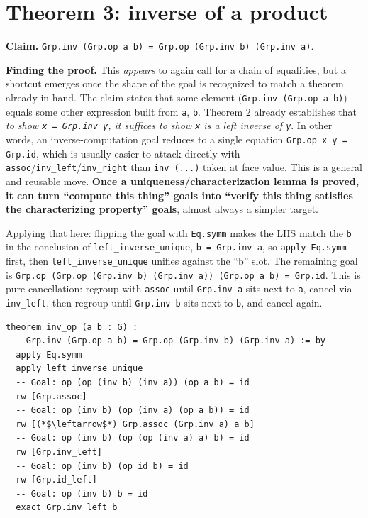 \section{Theorem 3: inverse of a product}\label{sec:07-group-theorems:04-theorem-3:1}

\textbf{Claim.} \texttt{Grp.inv (Grp.op a b) = Grp.op (Grp.inv b) (Grp.inv a)}.

\textbf{Finding the proof.} This \emph{appears} to again call for a chain of equalities, but a shortcut emerges once the shape of the goal is recognized to match a theorem already in hand. The claim states that some element (\texttt{Grp.inv (Grp.op a b)}) equals some other expression built from \texttt{a}, \texttt{b}. Theorem 2 already establishes that \emph{to show \texttt{x = Grp.inv y}, it suffices to show \texttt{x} is a left inverse of \texttt{y}}. In other words, an inverse-computation goal reduces to a single equation \texttt{Grp.op x y = Grp.id}, which is usually easier to attack directly with \texttt{assoc}/\texttt{inv\_\allowbreak{}left}/\texttt{inv\_\allowbreak{}right} than \texttt{inv (...)} taken at face value. This is a general and reusable move. \textbf{Once a uniqueness/characterization lemma is proved, it can turn ``compute this thing'' goals into ``verify this thing satisfies the characterizing property'' goals}, almost always a simpler target.

Applying that here: flipping the goal with \texttt{Eq.symm} makes the LHS match the \texttt{b} in the conclusion of \texttt{left\_\allowbreak{}inverse\_\allowbreak{}unique}, \texttt{b = Grp.inv a}, so \texttt{apply Eq.symm} first, then \texttt{left\_\allowbreak{}inverse\_\allowbreak{}unique} unifies against the ``b'' slot. The remaining goal is \texttt{Grp.op (Grp.op (Grp.inv b) (Grp.inv a)) (Grp.op a b) = Grp.id}. This is pure cancellation: regroup with \texttt{assoc} until \texttt{Grp.inv a} sits next to \texttt{a}, cancel via \texttt{inv\_\allowbreak{}left}, then regroup until \texttt{Grp.inv b} sits next to \texttt{b}, and cancel again.

\begin{lstlisting}
theorem inv_op (a b : G) :
    Grp.inv (Grp.op a b) = Grp.op (Grp.inv b) (Grp.inv a) := by
  apply Eq.symm
  apply left_inverse_unique
  -- Goal: op (op (inv b) (inv a)) (op a b) = id
  rw [Grp.assoc]
  -- Goal: op (inv b) (op (inv a) (op a b)) = id
  rw [(*$\leftarrow$*) Grp.assoc (Grp.inv a) a b]
  -- Goal: op (inv b) (op (op (inv a) a) b) = id
  rw [Grp.inv_left]
  -- Goal: op (inv b) (op id b) = id
  rw [Grp.id_left]
  -- Goal: op (inv b) b = id
  exact Grp.inv_left b
\end{lstlisting}


